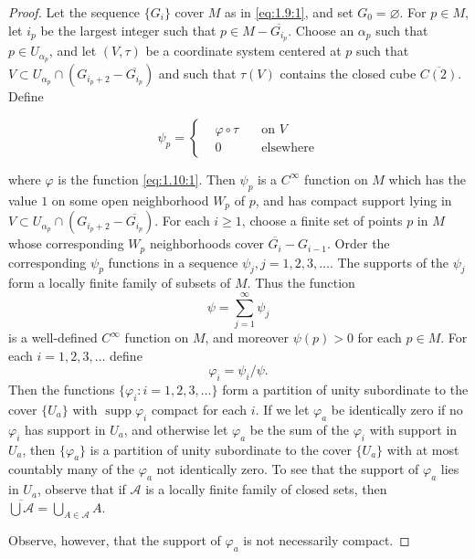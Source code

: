 \begin{proof}
	Let the sequence $\{G_i\}$ cover $M$ as in
	\eqref{eq:1.9:1}, and set $G_0 = \varnothing$.
	For $p \in M$, let $i_p$ be the largest integer such
	that $p \in M - \overline{G_{i_p}}$. Choose an
	$\alpha_p$ such that $p \in U_{\alpha_p}$, and let $(V, \tau)$
	be a coordinate system centered at $p$ such that
	$V \subset U_{\alpha_p} \cap (G_{i_p+2} - \overline{G_{i_p}})$
	and such that $\tau(V)$ contains the closed cube $\overline{C(2)}$. Define

	\begin{equation}
		\tag{1}\label{eq:1.11:1}
		\psi_{p}=\left\{\begin{aligned}{}&{{}\varphi\circ\tau}&{\quad\text{on }V}\\ {}&{{}0}&{\quad\text{elsewhere}} \end{aligned}\right.
	\end{equation}

	where $\varphi$ is the function \eqref{eq:1.10:1}.
	Then $\psi_p$ is a $C^\infty$ function on $M$ which has the value $1$ on some
	open neighborhood $W_p$ of $p$, and has compact support lying in
	$V \subset U_{\alpha_p} \cap (G_{i_p+2} - \overline{G_{i_p}})$.
	For each $i \geq 1$, choose a finite set of points $p$ in $M$
	whose corresponding $W_p$ neighborhoods cover
	$\overline{G_i} - G_{i-1}$. Order the corresponding $\psi_p$
	functions in a sequence $\psi_j, j=1,2,3,\ldots$. The
	supports of the $\psi_j$ form a locally finite family of subsets of $M$.
	Thus the function
	\begin{equation}
		\tag{2}\label{eq:1.11:2}
		\psi=\sum_{j=1}^{\infty}\psi_{j}
	\end{equation}
	is a well-defined $C^{\infty}$ function on $M$, and moreover
	$\psi(p) > 0$ for each $p \in M$. For each $i = 1, 2, 3, \ldots$ define
	\begin{equation}
		\tag{3}\label{eq:1.11:3}
		\varphi_{i}=\psi_{i}/\psi.
	\end{equation}
	Then the functions $\{\varphi_i: i=1,2,3,\ldots\}$ form a partition
	of unity subordinate to the cover $\{U_a\}$ with
	$\operatorname{supp} \varphi_i$ compact for each $i$.
	If we let $\varphi_a$ be identically zero if no
	$\varphi_i$ has support in $U_a$, and otherwise let
	$\varphi_a$ be the sum of the $\varphi_i$ with support in $U_a$,
	then $\{\varphi_a\}$ is a partition of unity subordinate to
	the cover $\{U_a\}$ with at most countably many of the $\varphi_a$
	not identically zero. To see that the support of $\varphi_a$
	lies in $U_a$, observe that if $\mathcal{A}$ is a locally
	finite family of closed sets, then $\overline{\bigcup\mathcal{A}} = \bigcup_{A\in\mathcal{A}}A$.

	Observe, however, that the support of $\varphi_{a}$ is not necessarily compact.
\end{proof}

